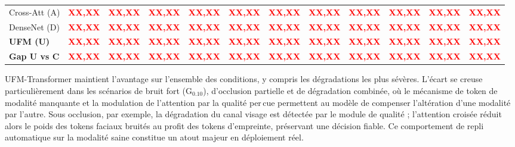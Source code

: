 \documentclass[12pt,a4paper]{report}
\begin{document}
\begin{table}[htbp]
{\begin{tabular}{lccccccccccc}
        Cross-Att (A) & \textcolor{red}{\textbf{XX,XX}} & \textcolor{red}{\textbf{XX,XX}} & \textcolor{red}{\textbf{XX,XX}} & \textcolor{red}{\textbf{XX,XX}} & \textcolor{red}{\textbf{XX,XX}} & \textcolor{red}{\textbf{XX,XX}} & \textcolor{red}{\textbf{XX,XX}} & \textcolor{red}{\textbf{XX,XX}} & \textcolor{red}{\textbf{XX,XX}} & \textcolor{red}{\textbf{XX,XX}} & \textcolor{red}{\textbf{XX,XX}} \\
        DenseNet (D) & \textcolor{red}{\textbf{XX,XX}} & \textcolor{red}{\textbf{XX,XX}} & \textcolor{red}{\textbf{XX,XX}} & \textcolor{red}{\textbf{XX,XX}} & \textcolor{red}{\textbf{XX,XX}} & \textcolor{red}{\textbf{XX,XX}} & \textcolor{red}{\textbf{XX,XX}} & \textcolor{red}{\textbf{XX,XX}} & \textcolor{red}{\textbf{XX,XX}} & \textcolor{red}{\textbf{XX,XX}} & \textcolor{red}{\textbf{XX,XX}} \\
        \rowcolor{gray!15}
        \textbf{UFM (U)} & \textcolor{red}{\textbf{XX,XX}} & \textcolor{red}{\textbf{XX,XX}} & \textcolor{red}{\textbf{XX,XX}} & \textcolor{red}{\textbf{XX,XX}} & \textcolor{red}{\textbf{XX,XX}} & \textcolor{red}{\textbf{XX,XX}} & \textcolor{red}{\textbf{XX,XX}} & \textcolor{red}{\textbf{XX,XX}} & \textcolor{red}{\textbf{XX,XX}} & \textcolor{red}{\textbf{XX,XX}} & \textcolor{red}{\textbf{XX,XX}} \\
        \hline
        \textbf{Gap U vs C} & \textcolor{red}{\textbf{XX,XX}} & \textcolor{red}{\textbf{XX,XX}} & \textcolor{red}{\textbf{XX,XX}} & \textcolor{red}{\textbf{XX,XX}} & \textcolor{red}{\textbf{XX,XX}} & \textcolor{red}{\textbf{XX,XX}} & \textcolor{red}{\textbf{XX,XX}} & \textcolor{red}{\textbf{XX,XX}} & \textcolor{red}{\textbf{XX,XX}} & \textcolor{red}{\textbf{XX,XX}} & \textcolor{red}{\textbf{XX,XX}} \\
        \hline
        \hline
    \end{tabular}
    }
\end{table}


UFM-Transformer maintient l'avantage sur l'ensemble des conditions, y compris les d\'{e}gradations les plus s\'{e}v\`{e}res. L'\'{e}cart se creuse particuli\`{e}rement dans les sc\'{e}narios de bruit fort (G$_{0.10}$), d'occlusion partielle et de d\'{e}gradation combin\'{e}e, o\`{u} le m\'{e}canisme de token de modalit\'{e} manquante et la modulation de l'attention par la qualit\'{e} per\,{c}ue permettent au mod\`{e}le de compenser l'alt\'{e}ration d'une modalit\'{e} par l'autre. Sous occlusion, par exemple, la d\'{e}gradation du canal visage est d\'{e}tect\'{e}e par le module de qualit\'{e} ; l'attention crois\'{e}e r\'{e}duit alors le poids des tokens faciaux bruit\'{e}s au profit des tokens d'empreinte, pr\'{e}servant une d\'{e}cision fiable. Ce comportement de repli automatique sur la modalit\'{e} saine constitue un atout majeur en d\'{e}ploiement r\'{e}el.
\end{document}
